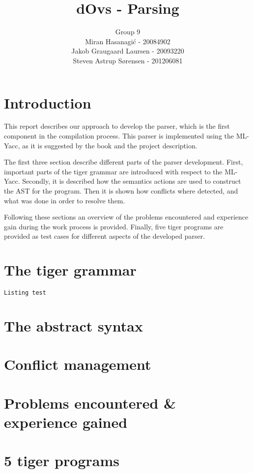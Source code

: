 \documentclass{article}
\title{dOvs - Parsing}
\author{
  Group 9 \\
  Miran Hasanagi\'{c} - 20084902 \\
  Jakob Graugaard Laursen - 20093220\\
  Steven Astrup S\o rensen - 201206081
}
\begin{document}
\maketitle

\section{Introduction}
This report describes our approach to develop the parser, which is the first component in the compilation process. This parser is implemented using the ML-Yacc, as it is suggested by the book and the project description.

The first three section describe different parts of the parser development.
First, important parts of the tiger grammar are introduced with respect to the ML-Yacc. Secondly, it is described how the semantics actions are used to construct the AST for the program. Then it is shown how conflicts where detected, and what was done in order to resolve them.

Following these sections an overview of the problems encountered and experience gain during the work process is provided. Finally, five tiger programs are provided as test cases for different aspects of the developed parser.

\section{The tiger grammar}

\begin{lstlisting}[frame=single]
Listing test
\end{lstlisting}

\section{The abstract syntax}

\section{Conflict management}

\section{Problems encountered \& experience gained}

\section{5 tiger programs}
\end{document}

